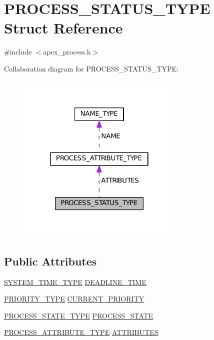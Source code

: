\hypertarget{structPROCESS__STATUS__TYPE}{}\section{P\+R\+O\+C\+E\+S\+S\+\_\+\+S\+T\+A\+T\+U\+S\+\_\+\+T\+Y\+PE Struct Reference}
\label{structPROCESS__STATUS__TYPE}


{\ttfamily \#include $<$apex\+\_\+process.\+h$>$}



Collaboration diagram for P\+R\+O\+C\+E\+S\+S\+\_\+\+S\+T\+A\+T\+U\+S\+\_\+\+T\+Y\+PE\+:
\nopagebreak
\begin{figure}[H]
\begin{center}
\leavevmode
\includegraphics[width=226pt]{structPROCESS__STATUS__TYPE__coll__graph}
\end{center}
\end{figure}
\subsection*{Public Attributes}
\begin{DoxyCompactItemize}
\item 
\hyperlink{apex__types_8h_a78cd52c2621ddf2eda68fcd4bedbc1a7}{S\+Y\+S\+T\+E\+M\+\_\+\+T\+I\+M\+E\+\_\+\+T\+Y\+PE} \hyperlink{structPROCESS__STATUS__TYPE_a6d80b5fda37441bd85be66724c8e39ea}{D\+E\+A\+D\+L\+I\+N\+E\+\_\+\+T\+I\+ME}
\item 
\hyperlink{apex__process_8h_a2185443fe5bfda31ff9cce2071f1b18c}{P\+R\+I\+O\+R\+I\+T\+Y\+\_\+\+T\+Y\+PE} \hyperlink{structPROCESS__STATUS__TYPE_a09a4859e0a86c5d194725cffa73e3580}{C\+U\+R\+R\+E\+N\+T\+\_\+\+P\+R\+I\+O\+R\+I\+TY}
\item 
\hyperlink{apex__process_8h_a79733d58c516410711ac89880fa90aa7}{P\+R\+O\+C\+E\+S\+S\+\_\+\+S\+T\+A\+T\+E\+\_\+\+T\+Y\+PE} \hyperlink{structPROCESS__STATUS__TYPE_a31a78e79d64f384b6f628c5441e6df90}{P\+R\+O\+C\+E\+S\+S\+\_\+\+S\+T\+A\+TE}
\item 
\hyperlink{structPROCESS__ATTRIBUTE__TYPE}{P\+R\+O\+C\+E\+S\+S\+\_\+\+A\+T\+T\+R\+I\+B\+U\+T\+E\+\_\+\+T\+Y\+PE} \hyperlink{structPROCESS__STATUS__TYPE_a54f0a046bf957db798482952628b4364}{A\+T\+T\+R\+I\+B\+U\+T\+ES}
\end{DoxyCompactItemize}


